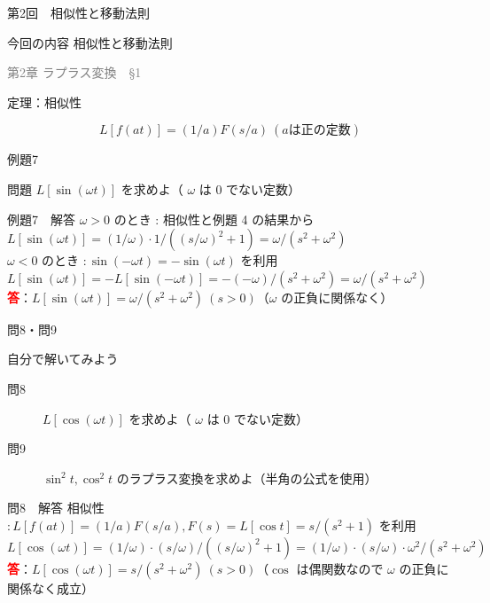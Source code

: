 \documentclass[professionalfonts]{beamer}
\begin{document}
\begin{frame}{第2回　相似性と移動法則}
  \begin{block}{今回の内容}
  相似性と移動法則
  \end{block}
  \vfill\hfill{\scriptsize \textcolor{gray}{第2章 ラプラス変換　§1}}
\end{frame}

\begin{frame}{定理：相似性}
  \begin{block}{}
  \[
    L[f(at)] = (1/a) F(s/a) \ (a は正の定数)
  \]
  \end{block}
\end{frame}

\begin{frame}{例題7}
  \begin{exampleblock}{問題}
    $L[\sin(\omega t)]$ を求めよ（ $\omega$ は 0 でない定数）\\[2pt]
  \end{exampleblock}
\end{frame}

\begin{frame}{例題7　解答}
  $\omega > 0$ のとき : 相似性と例題 4 の結果から\\[4pt]
  $L[\sin(\omega t)] = (1/\omega) \cdot 1/((s/\omega)^{2}+1) = \omega/(s^{2}+\omega^{2})$\\[4pt]
  $\omega < 0$ のとき $: \sin(-\omega t) = -\sin(\omega t)$ を利用\\[4pt]
  $L[\sin(\omega t)] = -L[\sin(-\omega t)] = -(-\omega)/(s^{2}+\omega^{2}) = \omega/(s^{2}+\omega^{2})$
  \\[8pt]\textcolor{red}{\textbf{答}}：$L[\sin(\omega t)] = \omega/(s^{2}+\omega^{2}) \ (s > 0)$（$\omega$ の正負に関係なく）
\end{frame}

\begin{frame}{問8・問9}
  \begin{exampleblock}{自分で解いてみよう}
  \begin{description}
    \item[問8] $L[\cos(\omega t)]$ を求めよ（ $\omega$ は 0 でない定数）
    \item[問9] $\sin^{2}t, \cos^{2}t$ のラプラス変換を求めよ（半角の公式を使用）
  \end{description}
  \end{exampleblock}
\end{frame}

\begin{frame}{問8　解答}
  相似性 $: L[f(at)] = (1/a)F(s/a), F(s) = L[\cos t] = s/(s^{2}+1)$ を利用\\[4pt]
  $L[\cos(\omega t)] = (1/\omega)\cdot(s/\omega)/((s/\omega)^{2}+1) = (1/\omega)\cdot(s/\omega)\cdot\omega^{2}/(s^{2}+\omega^{2})$
  \\[8pt]\textcolor{red}{\textbf{答}}：$L[\cos(\omega t)] = s/(s^{2}+\omega^{2}) \ (s > 0)$（$\cos$ は偶関数なので $\omega$ の正負に関係なく成立）
\end{frame}
\end{document}
